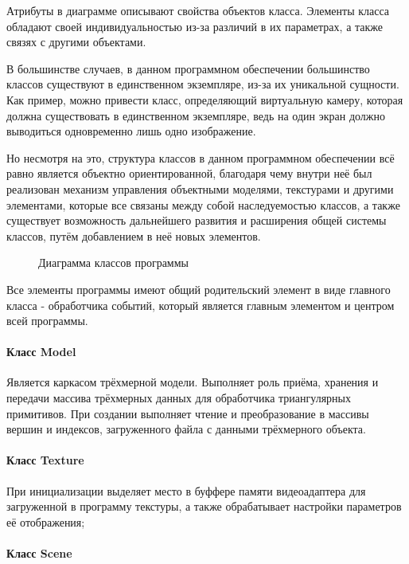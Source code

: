 Атрибуты в диаграмме описывают свойства объектов класса. Элементы класса обладают своей индивидуальностью из-за различий в их параметрах, а также связях с другими объектами. 

В большинстве случаев, в данном программном обеспечении большинство классов существуют в единственном экземпляре, из-за их уникальной сущности. Как пример, можно привести класс, определяющий виртуальную камеру, которая должна существовать в единственном экземпляре, ведь на один экран должно выводиться одновременно лишь одно изображение.

Но несмотря на это, структура классов в данном программном обеспечении всё равно является объектно ориентированной, благодаря чему внутри неё был реализован механизм управления объектными моделями, текстурами и другими элементами, которые все связаны между собой наследуемостью классов, а также существует возможность дальнейшего развития и расширения общей системы классов, путём добавлением в неё новых элементов.

\begin{figure}[H]
\caption{Диаграмма классов программы}
\label{diagram3:image}
\end{figure}

Все элементы программы имеют общий родительский элемент в виде главного класса - обработчика событий, который является главным элементом и центром всей программы.

\paragraph{Класс Model}

Является каркасом трёхмерной модели. Выполняет роль приёма, хранения и передачи массива трёхмерных данных для обработчика триангулярных примитивов. При создании выполняет чтение и преобразование в массивы вершин и индексов, загруженного файла с данными трёхмерного объекта.

\paragraph{Класс Texture}

При инициализации выделяет место в буффере памяти видеоадаптера для загруженной в программу текстуры, а также обрабатывает настройки параметров её отображения;

\paragraph{Класс Scene}

